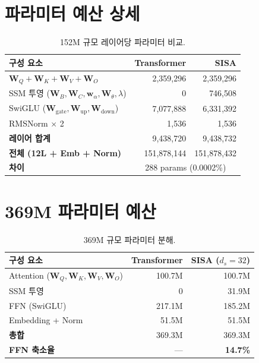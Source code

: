 \documentclass[11pt]{article}
\begin{document}
\section{파라미터 예산 상세}

\begin{table}[h]
\centering\small
\caption{152M 규모 레이어당 파라미터 비교.}
\begin{tabular}{lrr}
\toprule
\textbf{구성 요소} & \textbf{Transformer} & \textbf{SISA} \\
\midrule
$\mathbf{W}_Q + \mathbf{W}_K + \mathbf{W}_V + \mathbf{W}_O$ & 2,359,296 & 2,359,296 \\
SSM 투영 ($\mathbf{W}_B, \mathbf{W}_C, \mathbf{w}_\alpha, \mathbf{W}_\theta, \lambda$) & 0 & 746,508 \\
SwiGLU ($\mathbf{W}_{\text{gate}}, \mathbf{W}_{\text{up}}, \mathbf{W}_{\text{down}}$) & 7,077,888 & 6,331,392 \\
RMSNorm $\times$ 2 & 1,536 & 1,536 \\
\midrule
\textbf{레이어 합계} & 9,438,720 & 9,438,732 \\
\textbf{전체 (12L + Emb + Norm)} & 151,878,144 & 151,878,432 \\
\textbf{차이} & \multicolumn{2}{c}{288 params (0.0002\%)} \\
\bottomrule
\end{tabular}
\end{table}

\section{369M 파라미터 예산}

\begin{table}[h]
\centering\small
\caption{369M 규모 파라미터 분해.}
\begin{tabular}{lrr}
\toprule
\textbf{구성 요소} & \textbf{Transformer} & \textbf{SISA ($d_s{=}32$)} \\
\midrule
Attention ($\mathbf{W}_Q, \mathbf{W}_K, \mathbf{W}_V, \mathbf{W}_O$) & 100.7M & 100.7M \\
SSM 투영 & 0 & 31.9M \\
FFN (SwiGLU) & 217.1M & 185.2M \\
Embedding + Norm & 51.5M & 51.5M \\
\midrule
\textbf{총합} & 369.3M & 369.3M \\
\textbf{FFN 축소율} & --- & \textbf{14.7\%} \\
\bottomrule
\end{tabular}
\end{table}
\end{document}
